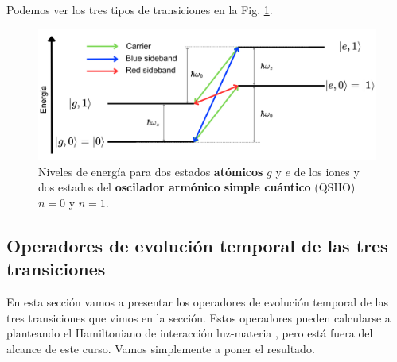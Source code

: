 Podemos ver los tres tipos de transiciones en la Fig. \ref{Fig_ions_Niveles_energia}.

	\begin{figure}[t]
	\centering 
	\includegraphics[width=1\linewidth]{Figuras/Fig_ions_Niveles_energia.png}
	\caption{Niveles de energía para dos estados \textbf{atómicos} $g$ y $e$ de los iones y dos estados del \textbf{oscilador armónico simple cuántico} (QSHO) $n=0$ y $n=1$.}
	\label{Fig_ions_Niveles_energia}
	\end{figure}

\subsection{Operadores de evolución temporal de las tres transiciones}

En esta sección vamos a presentar los operadores de evolución temporal de las tres transiciones que vimos en la sección. Estos operadores pueden calcularse a planteando el Hamiltoniano de interacción luz-materia \cite{bib_Haken1970}, pero está fuera del alcance de este curso. Vamos simplemente a poner el resultado.



